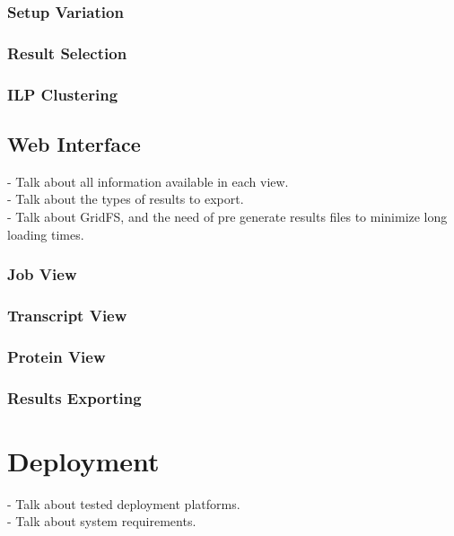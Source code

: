 \subsubsection*{Setup Variation}

\subsubsection*{Result Selection}

\subsubsection*{ILP Clustering}

\subsection{Web Interface}

\begin{Notes}
- Talk about all information available in each view.\\
- Talk about the types of results to export.\\
- Talk about GridFS, and the need of pre generate results files to minimize long
loading times.\\
\end{Notes}

\subsubsection*{Job View}

\subsubsection*{Transcript View}

\subsubsection*{Protein View}

\subsubsection*{Results Exporting}

\section{Deployment}

\begin{Notes}
- Talk about tested deployment platforms.\\
- Talk about system requirements.\\
\end{Notes}

